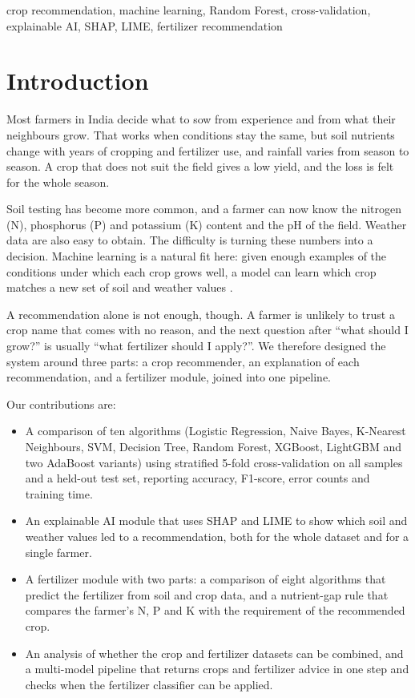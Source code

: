 \documentclass[conference]{IEEEtran}
\begin{document}
\begin{IEEEkeywords}
crop recommendation, machine learning, Random Forest, cross-validation, explainable AI, SHAP, LIME, fertilizer recommendation
\end{IEEEkeywords}

\section{Introduction}

Most farmers in India decide what to sow from experience and from what their neighbours grow. That works when conditions stay the same, but soil nutrients change with years of cropping and fertilizer use, and rainfall varies from season to season. A crop that does not suit the field gives a low yield, and the loss is felt for the whole season.

Soil testing has become more common, and a farmer can now know the nitrogen (N), phosphorus (P) and potassium (K) content and the pH of the field. Weather data are also easy to obtain. The difficulty is turning these numbers into a decision. Machine learning is a natural fit here: given enough examples of the conditions under which each crop grows well, a model can learn which crop matches a new set of soil and weather values \cite{liakos2018}.

A recommendation alone is not enough, though. A farmer is unlikely to trust a crop name that comes with no reason, and the next question after ``what should I grow?'' is usually ``what fertilizer should I apply?''. We therefore designed the system around three parts: a crop recommender, an explanation of each recommendation, and a fertilizer module, joined into one pipeline.

Our contributions are:
\begin{itemize}
\item A comparison of ten algorithms (Logistic Regression, Naive Bayes, K-Nearest Neighbours, SVM, Decision Tree, Random Forest, XGBoost, LightGBM and two AdaBoost variants) using stratified 5-fold cross-validation on all samples and a held-out test set, reporting accuracy, F1-score, error counts and training time.
\item An explainable AI module that uses SHAP and LIME to show which soil and weather values led to a recommendation, both for the whole dataset and for a single farmer.
\item A fertilizer module with two parts: a comparison of eight algorithms that predict the fertilizer from soil and crop data, and a nutrient-gap rule that compares the farmer's N, P and K with the requirement of the recommended crop.
\item An analysis of whether the crop and fertilizer datasets can be combined, and a multi-model pipeline that returns crops and fertilizer advice in one step and checks when the fertilizer classifier can be applied.
\end{itemize}
\end{document}
